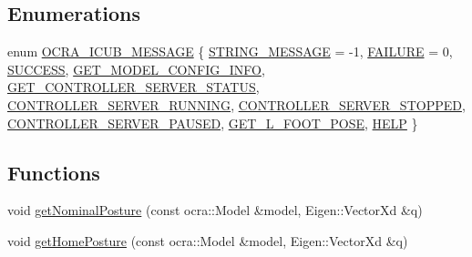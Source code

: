 \subsection*{Enumerations}
\begin{DoxyCompactItemize}
\item 
enum \hyperlink{namespaceocra__icub_afbd2db66b68005fb7cfac19210caf83f}{O\+C\+R\+A\+\_\+\+I\+C\+U\+B\+\_\+\+M\+E\+S\+S\+A\+GE} \{ \newline
\hyperlink{namespaceocra__icub_afbd2db66b68005fb7cfac19210caf83fafa982af27b4e13f109d8769472d75217}{S\+T\+R\+I\+N\+G\+\_\+\+M\+E\+S\+S\+A\+GE} = -\/1, 
\hyperlink{namespaceocra__icub_afbd2db66b68005fb7cfac19210caf83faa0c1832978fad84ef108d48265af68d2}{F\+A\+I\+L\+U\+RE} = 0, 
\hyperlink{namespaceocra__icub_afbd2db66b68005fb7cfac19210caf83fa67c96e3afcb39533f69c97dc5e9734e5}{S\+U\+C\+C\+E\+SS}, 
\hyperlink{namespaceocra__icub_afbd2db66b68005fb7cfac19210caf83fae8fe02f5f3b1b11d4749e720b9ec3636}{G\+E\+T\+\_\+\+M\+O\+D\+E\+L\+\_\+\+C\+O\+N\+F\+I\+G\+\_\+\+I\+N\+FO}, 
\newline
\hyperlink{namespaceocra__icub_afbd2db66b68005fb7cfac19210caf83fa772ab917d1ff28db029af9271208a69a}{G\+E\+T\+\_\+\+C\+O\+N\+T\+R\+O\+L\+L\+E\+R\+\_\+\+S\+E\+R\+V\+E\+R\+\_\+\+S\+T\+A\+T\+US}, 
\hyperlink{namespaceocra__icub_afbd2db66b68005fb7cfac19210caf83fa5dee3cfa0ab6c29f5546bc9e30c0aef5}{C\+O\+N\+T\+R\+O\+L\+L\+E\+R\+\_\+\+S\+E\+R\+V\+E\+R\+\_\+\+R\+U\+N\+N\+I\+NG}, 
\hyperlink{namespaceocra__icub_afbd2db66b68005fb7cfac19210caf83fafd31e40d18e553fc09105d360455bc49}{C\+O\+N\+T\+R\+O\+L\+L\+E\+R\+\_\+\+S\+E\+R\+V\+E\+R\+\_\+\+S\+T\+O\+P\+P\+ED}, 
\hyperlink{namespaceocra__icub_afbd2db66b68005fb7cfac19210caf83fa48ad7962d035a58257a0381872ce27b1}{C\+O\+N\+T\+R\+O\+L\+L\+E\+R\+\_\+\+S\+E\+R\+V\+E\+R\+\_\+\+P\+A\+U\+S\+ED}, 
\newline
\hyperlink{namespaceocra__icub_afbd2db66b68005fb7cfac19210caf83fafd78d107914396f475c3b12d2b31ea2a}{G\+E\+T\+\_\+\+L\+\_\+\+F\+O\+O\+T\+\_\+\+P\+O\+SE}, 
\hyperlink{namespaceocra__icub_afbd2db66b68005fb7cfac19210caf83fae7c9fa2563b6c0b14e5b05d1794dac36}{H\+E\+LP}
 \}
\end{DoxyCompactItemize}
\subsection*{Functions}
\begin{DoxyCompactItemize}
\item 
void \hyperlink{namespaceocra__icub_a07ffe33877389b6b111944e8a666e221}{get\+Nominal\+Posture} (const ocra\+::\+Model \&model, Eigen\+::\+Vector\+Xd \&q)
\item 
void \hyperlink{namespaceocra__icub_a91c3caf94014ea9988e56dd2572768ce}{get\+Home\+Posture} (const ocra\+::\+Model \&model, Eigen\+::\+Vector\+Xd \&q)
\end{DoxyCompactItemize}
